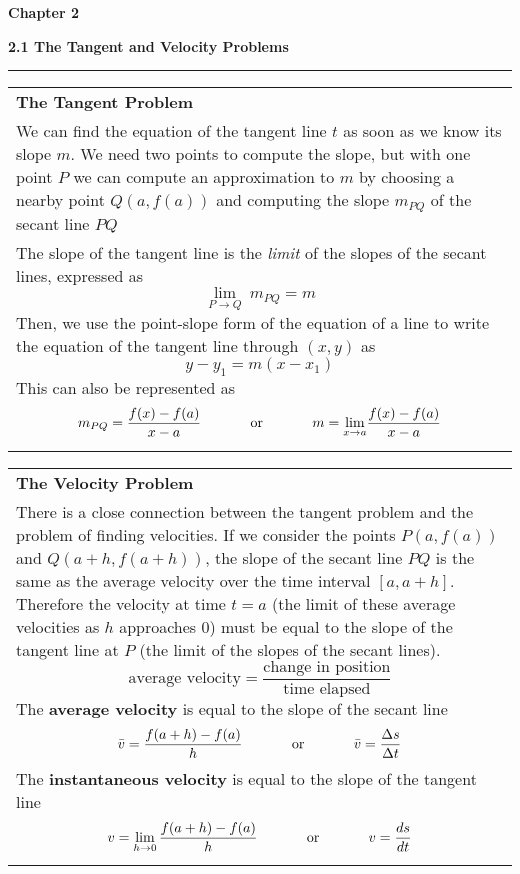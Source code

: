 \documentclass[fleqn]{article}
\begin{document}
\Huge\textbf{Chapter 2}
\vspace{16pt}

\begin{center}
\Large\textbf{2.1 The Tangent and Velocity Problems}

\noindent\hfill\rule{0.3\textwidth}{.4pt}\hfill
\vspace{12pt}

\large
\def\arraystretch{1.3}
{\setlength{\tabcolsep}{16pt}
\begin{tabularx}{.9\textwidth}{|X|}
\hline
	\vspace{1pt}
	\textbf{The Tangent Problem} \\[5pt]
	We can find the equation of the tangent line $t$ as soon as we know its slope $m$. We need two points to compute the slope, but with one point $P$ we can compute an approximation to $m$ by choosing a nearby point $Q(a, f(a))$ and computing the slope $m_{PQ}$ of the secant line $PQ$ \\[5pt]
	The slope of the tangent line is the \textit{limit} of the slopes of the secant lines, expressed as 
	$$\underset{P \to Q}{\lim} \: m_{PQ} = m$$
	Then, we use the point-slope form of the equation of a line to write the equation of the tangent line through $(x, y)$ as
	$$y - y_1 = m(x-x_1)$$
	This can also be represented as
	$$m_{PQ} = \frac{f(x)-f(a)}{x-a} \text{\hspace{32pt} or \hspace{32pt}} m = \underset{x \to a}{\lim}\frac{f(x)-f(a)}{x-a}$$ \\	
\hline
\end{tabularx}}
\vspace{12pt}

\def\arraystretch{1.3}
{\setlength{\tabcolsep}{16pt}
\begin{tabularx}{.9\textwidth}{|X|}
\hline
	\vspace{1pt}
	\textbf{The Velocity Problem} \\[5pt]
	There is a close connection between the tangent problem and the problem of finding velocities. If we consider the points $P(a, f(a))$ and $Q(a+h, f(a+h))$, the slope of the secant line $PQ$ is the same as the average velocity over the time interval $[a, a+h]$. Therefore the velocity at time $t=a$ (the limit of these average velocities as $h$ approaches $0$) must be equal to the slope of the tangent line at $P$ (the limit of the slopes of the secant lines).
	$$\text{average velocity} = \dfrac{\text{change in position}}{\text{time elapsed}}$$
	The \textbf{average velocity} is equal to the slope of the secant line
		$$\bar{v} = \frac{f(a+h)-f(a)}{h}\text{\hspace{32pt} or \hspace{32pt}} \bar{v} = \dfrac{\Delta s}{\Delta t}$$
	The \textbf{instantaneous velocity} is equal to the slope of the tangent line 
		$$v = \lim_{h \to 0} \frac{f(a+h)-f(a)}{h} \text{\hspace{32pt} or \hspace{32pt}} v = \dfrac{ds}{dt}$$ \\


\end{tabularx}}
\end{center}
\end{document}
